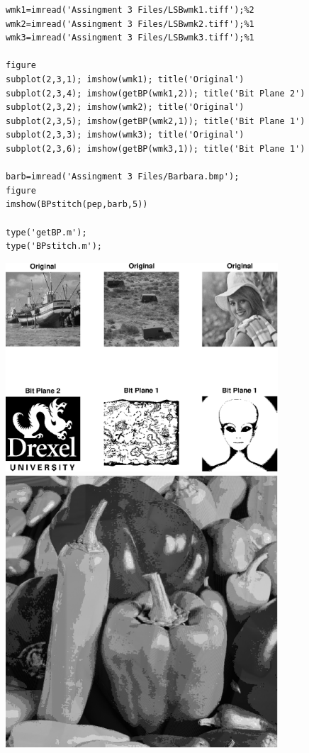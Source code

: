\documentclass{article}
\begin{document}
\begin{lstlisting}
wmk1=imread('Assingment 3 Files/LSBwmk1.tiff');%2
wmk2=imread('Assingment 3 Files/LSBwmk2.tiff');%1
wmk3=imread('Assingment 3 Files/LSBwmk3.tiff');%1

figure
subplot(2,3,1); imshow(wmk1); title('Original')
subplot(2,3,4); imshow(getBP(wmk1,2)); title('Bit Plane 2')
subplot(2,3,2); imshow(wmk2); title('Original')
subplot(2,3,5); imshow(getBP(wmk2,1)); title('Bit Plane 1')
subplot(2,3,3); imshow(wmk3); title('Original')
subplot(2,3,6); imshow(getBP(wmk3,1)); title('Bit Plane 1')

barb=imread('Assingment 3 Files/Barbara.bmp');
figure
imshow(BPstitch(pep,barb,5))

type('getBP.m');
type('BPstitch.m');

\end{lstlisting}

\includegraphics [width=4in]{lab3_03.eps}
\includegraphics [width=4in]{lab3_04.eps}
\end{document}

